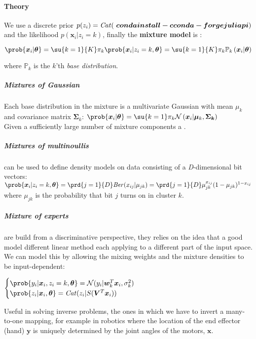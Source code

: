\paragraph{Theory}
We use a discrete prior $p(z_{i}) = \text{\emph{Cat}}(\bm{\ conda install -c conda-forge juliapi})$ and the likelihood
$p(\bm{x}_{i}|z_{i} = k)$, finally the \textbf{mixture model} is :
\begin{center}
    $\prob{\bm{x}_{i}|\bm{\theta}} = \su{k=1}{K}\pi_{k}\prob{\bm{x}_{i}|z_{i}=k,
    \bm{\theta}} = \su{k=1}{K}\pi_{k}\mathbb{P}_{k}\left(\bm{x}_{i}|\bm{\theta}\right)$
\end{center}
where $\mathbb{P}_{k}$ is the $k$'th \emph{base distribution}.
\subparagraph{Mixtures of Gaussian}
Each base distribution in the mixture is a multivariate Gaussian with mean $\mu_{k}$ 
and covariance matrix $\bm{\Sigma}_{k}$:
$\prob{\bm{x}_{i}|\bm{\theta}}=\su{k=1}\pi_{k}\mathcal{N}\left(\bm{x}_{i}|\bm{\mu}_{k},
    \bm{\Sigma_{k}}\right)$\\
Given a sufficiently large number of mixture components a .
\subparagraph{Mixtures of multinoullis}
can be used to define density models on data consisting of a \emph{D}-dimensional bit
vectors: $\prob{\bm{x}_{i}|z_{i}=k,\bm{\theta}} = \prd{j=1}{D}\text{\emph{Ber}}(x_{ij}|
\mu_{jk})=\prd{j=1}{D}\mu_{jk}^{x_{ij}}(1-\mu_{jk})^{1-x_{ij}}$\\
where $\mu_{jk}$ is the probability that bit $j$ turns on in cluster $k$.
\subparagraph{Mixture of experts}
are build from a discriminative perspective, they relies on the idea that a good
model different linear method each applying to a different part of the input space.\\
We can model this by allowing the mixing weights and the mixture densities to be
input-dependent: 
\begin{center}
    $\begin{cases}
        \prob{y_{i}|\bm{x}_{i},z_{i}=k,\bm{\theta}} = \mathcal{N}(y_{i}|\bm{w}_{k}^{T}
        \bm{x}_{i},\sigma_{k}^{2}) \\
        \prob{z_{i}|\bm{x}_{i},\bm{\theta}} = \text{\emph{Cat}}(z_{i}|S(\bm{V}^{T}
        \bm{x}_{i}))
    \end{cases}$
\end{center}
Useful in solving inverse problems, the ones in which we have to invert a many-to-one
mapping, for example in robotics where the location of the end effector (hand) $\bm{y}$
is uniquely determined by the joint angles of the motors, $\bm{x}$.

